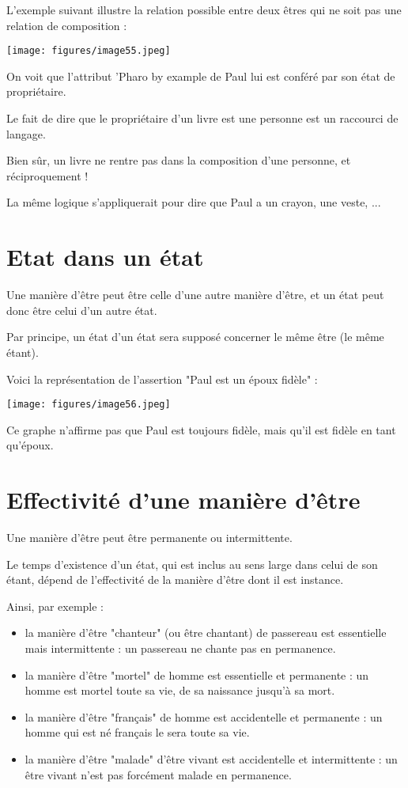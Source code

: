 \documentclass[a4paper, 12pt, openright, french]{book}
\begin{document}
L'exemple suivant illustre la relation possible entre
deux êtres qui ne soit pas une relation de composition :

\texttt{[image: figures/image55.jpeg]}

On voit que l'attribut 'Pharo by
example\textquotesingle{} de Paul lui est conféré par son état de
propriétaire.

Le fait de dire que le propriétaire d'un livre est une
personne est un raccourci de langage.

Bien sûr, un livre ne rentre pas dans la composition
d'une personne, et réciproquement !

La même logique s'appliquerait pour dire que Paul a un
crayon, une veste, ...

\section{Etat dans un état}

Une manière d'être peut être celle d'une
autre manière d'être, et un état peut donc être celui
d'un autre état.

Par principe, un état d'un état sera supposé concerner
le même être (le même étant).

Voici la représentation de l'assertion "Paul est un
époux fidèle" :

\texttt{[image: figures/image56.jpeg]}

Ce graphe n'affirme pas que Paul est toujours fidèle,
mais qu'il est fidèle en tant qu'époux.


\newpage
\section{Effectivité d'une manière d'être}

Une manière d'être peut être permanente ou
intermittente.

Le temps d'existence d'un état, qui est
inclus au sens large dans celui de son étant, dépend de
l'effectivité de la manière d'être dont
il est instance.

Ainsi, par exemple :

\begin{itemize}
\item
  la manière d'être "chanteur" (ou être chantant) de
  passereau est essentielle mais intermittente : un passereau ne chante
  pas en permanence.
\item
  la manière d'être "mortel" de homme est essentielle et
  permanente : un homme est mortel toute sa vie, de sa naissance
  jusqu'à sa mort.
\item
  la manière d'être "français" de homme est accidentelle
  et permanente : un homme qui est né français le sera toute sa vie.
\item
  la manière d'être "malade" d'être
  vivant est accidentelle et intermittente : un être vivant
  n'est pas forcément malade en permanence.
\end{itemize}
\end{document}
